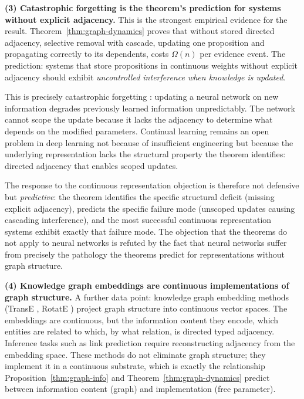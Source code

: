 \documentclass[11pt]{article}
\theoremstyle{definition}
\begin{document}
\textbf{(3) Catastrophic forgetting is the theorem's prediction for
systems without explicit adjacency.}
This is the strongest empirical evidence for the result.
Theorem~\ref{thm:graph-dynamics} proves that without stored directed
adjacency, selective removal with cascade, updating one proposition
and propagating correctly to its dependents, costs $\Omega(n)$ per
evidence event. The prediction: systems that store propositions in
continuous weights without explicit adjacency should exhibit
\emph{uncontrolled interference when knowledge is updated}.

This is precisely catastrophic forgetting
\cite{McCloskey1989,Kirkpatrick2017}: updating a neural network on new
information degrades previously learned information unpredictably.
The network cannot scope the update because it lacks the adjacency
to determine what depends on the modified parameters. Continual
learning remains an open problem in deep learning not because of
insufficient engineering but because the underlying representation
lacks the structural property the theorem identifies: directed
adjacency that enables scoped updates.

The response to the continuous representation objection is therefore
not defensive but \emph{predictive}: the theorem identifies the specific
structural deficit (missing explicit adjacency), predicts the specific
failure mode (unscoped updates causing cascading interference), and the
most successful continuous representation systems exhibit exactly that
failure mode. The objection that the theorems do not apply to neural
networks is refuted by the fact that neural networks suffer from
precisely the pathology the theorems predict for representations
without graph structure.

\textbf{(4) Knowledge graph embeddings are continuous implementations
of graph structure.}
A further data point: knowledge graph embedding methods (TransE
\cite{Bordes2013}, RotatE \cite{Sun2019}) project graph structure into
continuous vector spaces. The embeddings are continuous, but the
information content they encode, which entities are related to which,
by what relation, is directed typed adjacency. Inference tasks such
as link prediction require reconstructing adjacency from the embedding
space. These methods do not eliminate graph structure; they implement it
in a continuous substrate, which is exactly the relationship
Proposition~\ref{thm:graph-info} and Theorem~\ref{thm:graph-dynamics} predict between
information content (graph) and implementation (free parameter).
\end{document}

